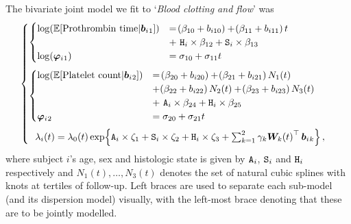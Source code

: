 The bivariate joint model we fit to `\textit{Blood clotting and flow}' was 
\begin{equation}
    \begin{aligned}
    \begin{cases}
        \begin{cases}
           \log\lb\Exp\ls\mathrm{Prothrombin\ time}|\b{_1}\rs\rb&=\lb\beta_{10}+b_{i10}\rb + \lb\beta_{11}+b_{i11}\rb t \\&+\ \tt{H}_i\times\beta_{12} + \tt{S}_i\times\beta_{13}\\ 
           \log\lb\bphi{_1}\rb&=\sigma_{10} + \sigma_{11}t\\ 
        \end{cases}
        \\\noalign{\vspace*{2mm}}
        \begin{cases}
            \log\lb\Exp\ls\mathrm{Platelet\ count}|\b{_2}\rs\rb&=\lb\beta_{20}+b_{i20}\rb + \lb\beta_{21} + b_{i21}\rb N_1(t) \\&+ \lb\beta_{22} + b_{i22}\rb N_2(t) + \lb\beta_{23} + b_{i23}\rb N_3(t) \\&+\  
            \tt{A}_i\times\beta_{24} + \tt{H}_i\times\beta_{25}\\ 
            \bphi{_2}&=\sigma_{20} + \sigma_{21}t\\ 
        \end{cases}
        \\\noalign{\vspace*{2mm}}
        \ \ \li\lb t\rb = \lo\lb t\rb \exp\lbr\tt{A}_i\times\zeta_1+\tt{S}_i\times\zeta_2+\tt{H}_i\times\zeta_3+\sum_{k=1}^2\gamma_k\bm{W}_k\lb t\rb^\top\b{_k}\rbr,
    \end{cases}       
    \end{aligned}
\label{eq:appendix-PBC-multivs-bloods}
\end{equation}
where subject $i$'s age, sex and histologic state is given by $\tt{A}_i$, $\tt{S}_i$ and $\tt{H}_i$ respectively and $N_1(t),\dots,N_3(t)$ denotes the set of natural cubic splines with knots at tertiles of follow-up. Left braces are used to separate each sub-model (and its dispersion model) visually, with the left-most brace denoting that these are to be jointly modelled.

